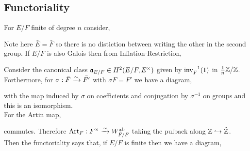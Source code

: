 \documentclass[12pt]{article}
\begin{document}
\subsection{Functoriality}

For $E / F$ finite of degree $n$ consider,
\begin{center}
\end{center}
Note here $\bar{E} = \bar{F}$ so there is no distiction between writing the other in the second group.
If $E/F$ is also Galois then from Inflation-Restriction,
\begin{center}
\end{center}
Consider the canonical class $\mathfrak{a}_{E/F} \in H^2(E/F, E^\times)$ given by $\mathrm{inv}^{-1}_{F}(1)$ in $\frac{1}{n} \mathbb{Z} / \mathbb{Z}$.
\bigskip\\
Forthermore, for $\sigma : \bar{F} \xrightarrow{\sim} \bar{F'}$ with $\sigma F = F'$ we have a diagram,
\begin{center}
\end{center}
with the map induced by $\sigma$ on coefficients and conjugation by $\sigma^{-1}$ on groups and this is an isomorphism. 
\bigskip\\
For the Artin map,
\begin{center}
\end{center}
commutes. Therefore $\mathrm{Art}_F : F^\times \xrightarrow{\sim} W_{\bar{F} / F}^{\mathrm{ab}}$ taking the pulback along $\mathbb{Z} \hookrightarrow \hat{\mathbb{Z}}$. Then the functoriality says that, if $E / F$ is finite then we have a diagram,
\begin{center}
\end{center}
\end{document}
